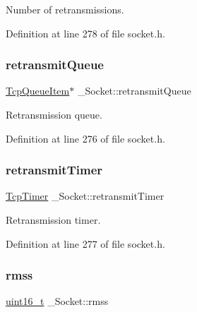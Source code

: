 Number of retransmissions. 



Definition at line 278 of file socket.\+h.

\mbox{\label{struct__Socket_aacd913f1fdecfe01397a5e47534f48a2}} 
\subsubsection{\texorpdfstring{retransmit\+Queue}{retransmitQueue}}
{\footnotesize\ttfamily \hyperlink{tcp_8h_acfab1d17433f464b8b01a6fbb186bb9e}{Tcp\+Queue\+Item}$\ast$ \+\_\+\+Socket\+::retransmit\+Queue}



Retransmission queue. 



Definition at line 276 of file socket.\+h.

\mbox{\label{struct__Socket_a629026470a722cf45d880c64a3d3b7a0}} 
\subsubsection{\texorpdfstring{retransmit\+Timer}{retransmitTimer}}
{\footnotesize\ttfamily \hyperlink{structTcpTimer}{Tcp\+Timer} \+\_\+\+Socket\+::retransmit\+Timer}



Retransmission timer. 



Definition at line 277 of file socket.\+h.

\mbox{\label{struct__Socket_ab67196c9d6187c63435c02a65dc150bc}} 
\subsubsection{\texorpdfstring{rmss}{rmss}}
{\footnotesize\ttfamily \hyperlink{stdint_8h_a273cf69d639a59973b6019625df33e30}{uint16\+\_\+t} \+\_\+\+Socket\+::rmss}



